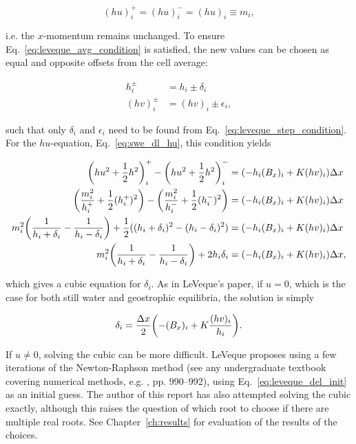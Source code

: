 \begin{equation}
  (hu)_i^+ = (hu)_i^- = (hu)_i \equiv m_i,
\end{equation}

i.e. the $x$-momentum remains unchanged. To ensure Eq.~\ref{eq:leveque_avg_condition} is satisfied, the new values can be chosen as equal and opposite offsets from the cell average:

\begin{align}
  h_i^\pm &= h_i \pm \delta_i \\
  (hv)_i^\pm &= (hv)_i \pm \epsilon_i,
\end{align}

such that only $\delta_i$ and $\epsilon_i$ need to be found from Eq.~\ref{eq:leveque_step_condition}. For the $hu$-equation, Eq.~\ref{eq:swe_dl_hu}, this condition yields

\begin{align}
  \qty(hu^2 + \frac{1}{2}h^2)_i^+ - \qty(hu^2 + \frac{1}{2}h^2)_i^- &= (- h_i (B_x)_i + K (hv)_i)\Delta x \\
  \qty(\frac{m_i^2}{h_i^+} + \frac{1}{2}(h_i^+)^2) - \qty(\frac{m_i^2}{h_i^-} + \frac{1}{2}(h_i^-)^2) &= (- h_i (B_x)_i + K (hv)_i)\Delta x \\
  m_i^2\qty(\frac{1}{h_i+\delta_i} - \frac{1}{h_i-\delta_i}) + \frac{1}{2} ((h_i+\delta_i)^2 - (h_i-\delta_i)^2) &= (- h_i (B_x)_i + K (hv)_i)\Delta x \\
  m_i^2\qty(\frac{1}{h_i+\delta_i} - \frac{1}{h_i-\delta_i}) + 2 h_i \delta_i &= (- h_i (B_x)_i + K (hv)_i)\Delta x,
\end{align}

which gives a cubic equation for $\delta_i$. As in LeVeque's paper, if $u = 0$, which is the case for both still water and geostrophic equilibria, the solution is simply

\begin{equation}
  \label{eq:leveque_del_init}
  \delta_i = \frac{\Delta x}{2} \qty(-(B_x)_i + K\frac{(hv)_i}{h_i}).
\end{equation}

If $u \neq 0$, solving the cubic can be more difficult. LeVeque proposes using a few iterations of the Newton-Raphson method (see any undergraduate textbook covering numerical methods, e.g. \cite{riley2006mathematical}, pp. 990--992), using Eq.~\ref{eq:leveque_del_init} as an initial guess. The author of this report has also attempted solving the cubic exactly, although this raises the question of which root to choose if there are multiple real roots. See Chapter~\ref{ch:results} for evaluation of the results of the choices.

